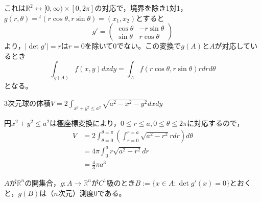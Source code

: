 \begin{example}[極座標変換:$x_1=r\cos\theta,x_2=r\sin\theta$]
これは$\mathbb{R}^2\leftrightarrow [0,\infty)\times[0,2\pi]$の対応で，境界を除き1対1，$g(r,\theta)={}^t(r\cos\theta,r\sin\theta)=(x_1,x_2)$とすると
\[
	g'=
	\begin{pmatrix}
	\cos\theta & -r\sin\theta \\
	\sin\theta & r\cos\theta
	\end{pmatrix}
\]
より，$|\det g'|=r$は$r=0$を除いて$0$でない。この変換で$g(A)$と$A$が対応しているとき
\[
	\int_{g(A)}f(x,y)dxdy=\int_A f(r\cos\theta,r\sin\theta)rdrd\theta
\]
となる。
\begin{ex}
	3次元球の体積$\displaystyle V=2\int_{x^2+y^2\leq a^2}\sqrt{a^2-x^2-y^2}dxdy$
\end{ex}
円$x^2+y^2\leq a^2$は極座標変換により，$0\leq r\leq a,0\leq \theta\leq 2\pi$に対応するので，
\[
\begin{split}
	V&=2\int_{\theta=0}^{\theta=\pi}\left(\int_{r=0}^{r=a}\sqrt{a^2-r^2}rdr\right)d\theta\\
	&=4\pi\int_0^a r\sqrt{a^2-r^2}dr\\
	&=\frac{4}{3}\pi a^3
\end{split}
\]

\begin{framed}
	\begin{thm}[Sardの定理]
		$A$が$\mathbb{R}^n$の開集合，$g:A\to\mathbb{R}^n$が$C^1$級のとき$B:=\{x\in A:\det g'(x)=0\}$とおくと，$g(B)$は（$n$次元）測度$0$である。\footnotemark
	\end{thm}
\end{framed}
\end{example}